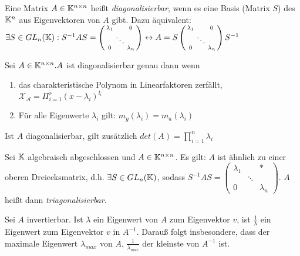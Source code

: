 \begin{definition}[Diagonalisierbarkeit]
	Eine Matrix $A \in \mathbb{K}^{n \times n}$ heißt \emph{diagonalisierbar}, wenn es eine Basis (Matrix $S$) des $\mathbb{K}^n$ aus Eigenvektoren von $A$ gibt. Dazu äquivalent: $\exists S \in GL_n(\mathbb{K}) : S^{-1} A S = \left( \begin{smallmatrix}
	\lambda_1 & & 0 \\
	& \ddots & \\
	0 & & \lambda_n
	\end{smallmatrix} \right) \leftrightarrow A = S\left(\begin{smallmatrix}
	\lambda_1 & & 0 \\
	& \ddots & \\
	0 & & \lambda_n
	\end{smallmatrix} \right) S^{-1} $ 
\end{definition}

\begin{satz}
	Sei $A \in \mathbb{K}^{n \times n}. A$ ist diagonalisierbar genau dann wenn 
	\begin{enumerate}[noitemsep]
		\item das charakteristische Polynom in Linearfaktoren zerfällt, $\mathcal{X_A}= \Pi_{i=1}^r (x - \lambda_i)^{l_i}$
		\item Für alle Eigenwerte $\lambda_i$ gilt: $m_g(\lambda_i) = m_a(\lambda_i)$
	\end{enumerate}	
	Ist $A$ diagonalisierbar, gilt zusätzlich $det(A) = \prod_{i=1}^n \lambda_i$
\end{satz}

\begin{satz}
	Sei $\mathbb{K}$ algebraisch abgeschlossen und $A \in \mathbb{K}^{n \times n}$. Es gilt: $A$ ist ähnlich zu einer oberen Dreiecksmatrix, d.h. $\exists S \in GL_n(\mathbb{K})$, sodass $S^{-1} A S = \left( \begin{smallmatrix} 
	\lambda_1 & & * \\
	& \ddots & \\
	0 & & \lambda_n
	\end{smallmatrix} \right)$. $A$ heißt dann \emph{triagonalisierbar}.
\end{satz}

\begin{satz}
	Sei $A$ invertierbar. Ist $\lambda$ ein  Eigenwert von $A$ zum Eigenvektor $v$, ist $\frac{1}{\lambda}$ ein Eigenwert zum Eigenvektor $v$ in $A^{-1}$. Darauß folgt insbesondere, dass der maximale Eigenwert $\lambda_{max}$ von $A$, $\frac{1}{\lambda_{max}}$ der kleinste von $A^{-1}$ ist.
\end{satz}

